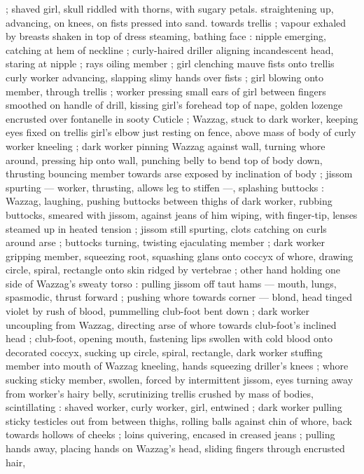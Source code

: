 ; shaved girl, skull riddled with thorns, with sugary petals. 
straightening up, advancing, on knees, on fists pressed into sand. 
towards trellis ; vapour exhaled by breasts shaken in top of dress 
steaming, bathing face : nipple emerging, catching at hem of 
neckline ; curly-haired driller aligning incandescent head, staring at 
nipple ; rays oiling member ; girl clenching mauve fists onto trellis 
curly worker advancing, slapping slimy hands over fists ; girl blowing 
onto member, through trellis ; worker pressing small ears of girl 
between fingers smoothed on handle of drill, kissing girl's forehead 
top of nape, golden lozenge encrusted over fontanelle in sooty 
Cuticle ; Wazzag, stuck to dark worker, keeping eyes fixed on trellis 
girl's elbow just resting on fence, above mass of body of curly 
worker kneeling ; dark worker pinning Wazzag against wall, turning 
whore around, pressing hip onto wall, punching belly to bend top of 
body down, thrusting bouncing member towards arse exposed by 
inclination of body ; jissom spurting --- worker, thrusting, allows leg 
to stiffen ---, splashing buttocks : Wazzag, laughing, pushing 
buttocks between thighs of dark worker, rubbing buttocks, smeared 
with jissom, against jeans of him wiping, with finger-tip, lenses 
steamed up in heated tension ; jissom still spurting, clots catching on 
curls around arse ; buttocks turning, twisting ejaculating member ; 
dark worker gripping member, squeezing root, squashing glans onto 
coccyx of whore, drawing circle, spiral, rectangle onto skin ridged by 
vertebrae ; other hand holding one side of Wazzag's sweaty torso : 
pulling jissom off taut hams --- mouth, lungs, spasmodic, thrust 
forward ; pushing whore towards corner --- blond, head tinged violet 
by rush of blood, pummelling club-foot bent down ; dark worker 
uncoupling from Wazzag, directing arse of whore towards club-foot's 
inclined head ; club-foot, opening mouth, fastening lips swollen with 
cold blood onto decorated coccyx, sucking up circle, spiral, 
rectangle, dark worker stuffing member into mouth of Wazzag 
kneeling, hands squeezing driller's knees ; whore sucking sticky 
member, swollen, forced by intermittent jissom, eyes turning away 
from worker's hairy belly, scrutinizing trellis crushed by mass of 
bodies, scintillating : shaved worker, curly worker, girl, entwined ; 
dark worker pulling sticky testicles out from between thighs, rolling 
balls against chin of whore, back towards hollows of cheeks ; loins 
quivering, encased in creased jeans ; pulling hands away, placing 
hands on Wazzag's head, sliding fingers through encrusted hair, 
